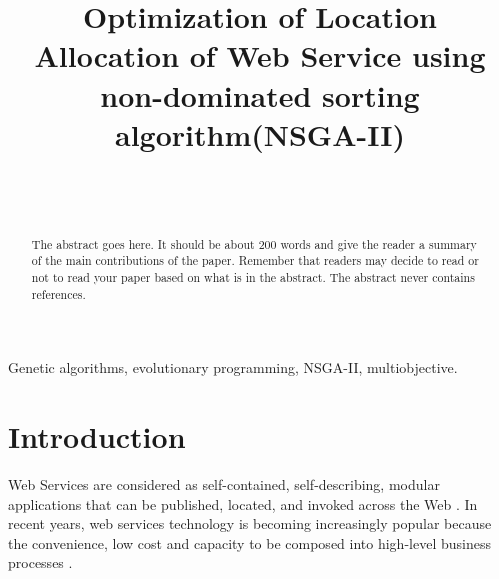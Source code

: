\documentclass[twoside]{article}
\begin{document}
\title{\bf Optimization of Location Allocation of Web Service using non-dominated sorting algorithm(NSGA-II)
}  

\author{ \hfill {}\\ 
\AND
        \hfill {}\\
}

\maketitle

\begin{abstract}

The abstract goes here.  It should be about 200 words and give the
reader a summary of the main contributions of the paper.   
Remember that readers may decide to read or not to read your
paper based on what is in the abstract.  The abstract never
contains references.  

\end{abstract}

\begin{keywords}

Genetic algorithms, 
evolutionary programming,
NSGA-II,
multiobjective.

\end{keywords}
\section{Introduction}
Web Services are considered as self-contained, self-describing, modular applications that can be published, located, and invoked across the Web \cite{Ran:2003:MWS:844357.844360}. 
In recent years, web services technology is becoming increasingly popular because the convenience, low cost and capacity to be composed into high-level business processes \cite{Aboolian200964}.
\end{document}

